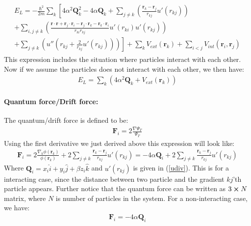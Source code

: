 \documentclass[a4paper, 10pt]{article}
\begin{document}
\begin{appendices}
\begin{align}
		\begin{split}
		E_{L} = -\frac{\hbar^{2}}{2m}\sum_{k}\left[
		4\alpha^{2}\boldsymbol{Q}_{k}^{2} - 4\alpha\boldsymbol{Q}_{k} + \sum_{j \neq k}\left(\frac{\boldsymbol{r}_{k} - \boldsymbol{r}_{j}}{r_{kj}}u'(r_{kj})\right)\right.
		\\ \left. + \sum_{i,j \neq k}\left(\frac{\boldsymbol{r}\cdot\boldsymbol{r} + \boldsymbol{r}_{j}\cdot\boldsymbol{r}_{i} - \boldsymbol{r}_{j}\cdot\boldsymbol{r}_{k} -\boldsymbol{r}_{k}\cdot\boldsymbol{r}_{i}}{r_{ki}r_{kj}}u'(r_{ki})u'(r_{kj})\right)\right.
		\\
		\left. + \sum_{j \neq k}\left(u''(r_{kj} + \frac{2}{r_{kj}}u'(r_{kj}))\right)\right]
		+ \sum_{k}V_{ext}(\boldsymbol{r}_{k}) + \sum_{i < j}V_{int}(\boldsymbol{r}_{i}, \boldsymbol{r}_{j})
		\end{split}
		\end{align}
		This expression includes the situation where particles interact with each other.
		Now if we assume the particles does not interact with each other, we then have:
		\begin{align}
		E_{L} = \sum_{k}\left(4\alpha^{2}\boldsymbol{Q}_{k} + V_{ext}(\boldsymbol{r}_{k}) \right)
		\end{align}
		\paragraph{Quantum force/Drift force:}
		The quantum/drift force is defined to be:
		\begin{align}
		\boldsymbol{F}_{i} = 2\frac{\nabla\Psi_{T}}{\Psi_{T}}
		\end{align}
		Using the first derivative we just derived above this expression will look like:
		\begin{align}
		\boldsymbol{F}_{i} = 2\frac{\nabla_k \phi(\boldsymbol{r}_{k})}{\phi(\boldsymbol{r}_{k})}
		+
		2\sum_{j \neq k}\frac{\boldsymbol{r}_{k} - \boldsymbol{r}_{j}}{r_{kj}}u'(r_{kj})
		= -4\alpha\boldsymbol{Q}_{i} +
		2\sum_{j \neq k}\frac{\boldsymbol{r}_{k} - \boldsymbol{r}_{j}}{r_{kj}}u'(r_{kj})
		\end{align}
		Where $\boldsymbol{Q}_{i} = x_{i}\hat{i} + y_{i}\hat{j} + \beta z_{i}\hat{k}$ and
		$u'(r_{kj})$ is given in (\ref{udiv}). This is for a interacting case, since
		the distance between two particle and the gradient $kj$'th particle appears.
		Further notice that the quantum force can be written
		as $3\cross N$ matrix, where $N$ is number of particles in the system.
		For a non-interacting case, we have:
		\begin{align}
		\boldsymbol{F}_{i} = -4\alpha\boldsymbol{Q}_{i}
		\end{align}

\end{appendices}
\end{document}
